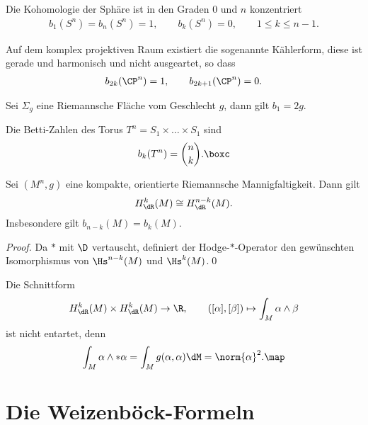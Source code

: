 \documentclass[%
	paper=a5,%
	fleqn,%
	DIV=18,%
	BCOR=0mm,
	fontsize=11pt,
	titlepage=false,%
	bibliography=totoc,
	DIV=18,%
	twoside=true,
	pdftitle=Riemannsche Geometrie,
	pdfauthor=Uwe Semmelmann,
	numbers=noendperiod]%
	{scrbook}
\begin{document}
\begin{ex}
\begin{exenum}
\item Die Kohomologie der Sphäre ist in den Graden $0$ und $n$ konzentriert
\begin{align*}
b_{1}(S^n)=b_{n}(S^n) = 1,\qquad b_{k}(S^n) = 0,\qquad 1\le k\le n-1.
\end{align*}
\item Auf dem komplex projektiven Raum existiert die sogenannte Kählerform, diese ist gerade und harmonisch und nicht ausgeartet, so dass
\begin{align*}
b_{2k}(\CP^n) = 1,\qquad b_{2k+1}(\CP^n) =0.
\end{align*}
\item Sei $\Sigma_{g}$ eine Riemannsche Fläche vom Geschlecht $g$, dann gilt $b_{1} = 2g$.
\item Die Betti-Zahlen des Torus $T^n = S_{1}\times \ldots \times S_{1}$ sind
\begin{align*}
b_{k}(T^n) = \binom{n}{k}.\boxc
\end{align*}
\end{exenum}
\end{ex}

\begin{cor}
Sei $(M^n,g)$ eine kompakte, orientierte Riemannsche Mannigfaltigkeit. Dann gilt
\begin{align*}
H_{\dR}^k(M) \cong H_{\dR}^{n-k}(M).
\end{align*}
Insbesondere gilt $b_{n-k}(M) = b_{k}(M)$.\fish
\end{cor}

\begin{proof}
Da $*$ mit $\D$ vertauscht, definiert der Hodge-$*$-Operator den gewünschten Isomorphismus von $\Hs^{n-k}(M)$ und $\Hs^k(M)$.\qed
\end{proof}

\begin{rem}
Die Schnittform
\begin{align*}
H_{\dR}^k(M)\times H_{\dR}^k(M)\to \R,\qquad
([\alpha],[\beta]) \mapsto \int_{M} \alpha\wedge \beta
\end{align*}
ist nicht entartet, denn\begin{align*}
\int_{M}\alpha\wedge *\alpha =  \int_{M} g(\alpha,\alpha)\dM = \norm{\alpha}^2.\map
\end{align*}
\end{rem}

\section{Die Weizenböck-Formeln}
\end{document}
